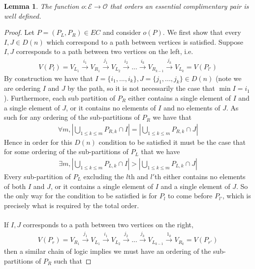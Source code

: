 \documentclass[11pt]{amsart}
\newtheorem{lemma}[thm]{Lemma}
\theoremstyle{definition}
\theoremstyle{remark}
\numberwithin{equation}{section}
\newcommand{\EC}{\mathcal{E}} %
\newcommand{\OP}{\mathcal{O}} %
\newcommand{\0}{\color{blue}{\mathsf{0}}}
\begin{document}
\begin{lemma} 
\label{o well defined}
The function $o:\EC \to \OP$ that orders an essential complimentary pair is well defined.
\end{lemma}

\begin{proof}
Let $P=(P_L,P_R) \in EC$ and consider $o(P)$. We first show that every $I,J \in D(n)$ which correspond to a path between vertices is satisfied. Suppose $I,J$ corresponds to a path between two vertices on the left, i.e.
\begin{align*}
    V(P_l) = V_{L_1} \xrightarrow{i_1} V_{R_1}\xrightarrow{j_1} V_{L_2} \xrightarrow{i_2}... \xrightarrow{i_{k}} V_{R_{k-1}} \xrightarrow{j_k} V_{L_k}=V(P_{l'})
\end{align*}
By construction we have that $I = \{i_1,...,i_k\},J=\{j_1,...,j_k\} \in D(n)$ (note we are ordering $I$ and $J$ by the path, so it is not necessarily the case that $\min I = i_1$). Furthermore, each sub partition of $P_R$ either contains a single element of $I$ and a single element of $J$, or it contains no elements of $I$ and no elements of $J$. As such for any ordering of the sub-partitions of $P_R$ we have that 
\begin{align*}
    \forall m, |\bigcup_{1\leq k \leq m} P_{R,k} \cap I| = |\bigcup_{1\leq k \leq m} P_{R,k} \cap J|
\end{align*}
Hence in order for this $D(n)$ condition to be satisfied it must be the case that for some ordering of the sub-partitions of $P_L$ that we have
\begin{align*}
    \exists m, |\bigcup_{1\leq k \leq m} P_{L,k} \cap I| > |\bigcup_{1\leq k \leq m} P_{L,k} \cap J|
\end{align*}
Every sub-partition of $P_L$ excluding the $l$th and $l'$th either contains no elements of both $I$ and $J$, or it contains a single element of $I$ and a single element of $J$. So the only way for the condition to be satisfied is for $P_l$ to come before $P_{l'}$, which is precisely what is required by the total order.
\\\\
If $I,J$ corresponds to a path between two vertices on the right,
\begin{align*}
    V(P_r) = V_{R_1} \xrightarrow{j_1} V_{L_1}\xrightarrow{i_1} V_{L_2} \xrightarrow{j_2}... \xrightarrow{j_{k}} V_{L_{k-1}} \xrightarrow{1_k} V_{R_k}=V(P_{r'})
\end{align*}
then a similar chain of logic implies we must have an ordering of the sub-partitions of $P_R$ such that

\end{proof}
\end{document}
